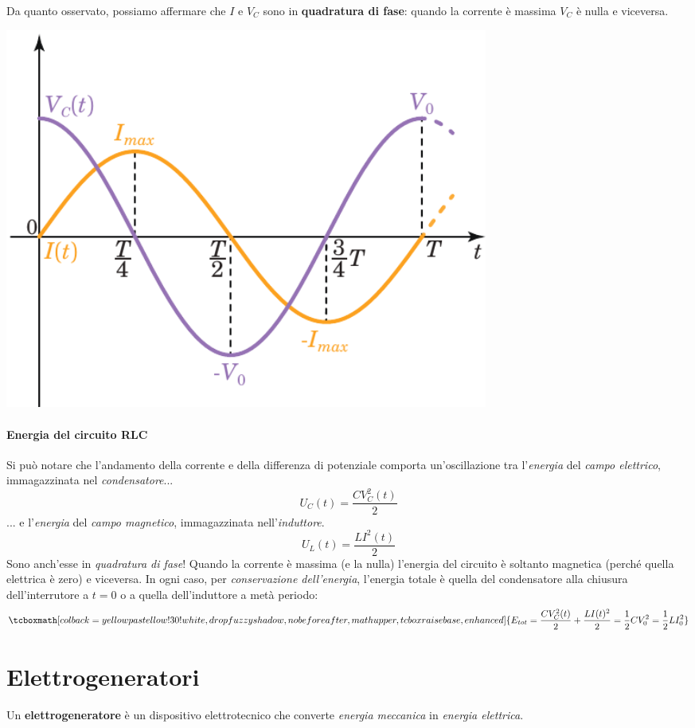Da quanto osservato, possiamo affermare che $I$ e $V_C$ sono in \textbf{quadratura di fase}: quando la corrente è massima $V_C$ è nulla e viceversa.
\begin{center}
	\includegraphics[width=0.7\textwidth]{images/chp11/chp11LCgraf.pdf}
\end{center}
\paragraph{Energia del circuito RLC}
Si può notare che l'andamento della corrente e della differenza di potenziale comporta un'oscillazione tra l'\textit{energia} del \textit{campo elettrico}, immagazzinata nel \textit{condensatore}...
\begin{equation*}
	U_C(t)=\frac{CV^2_C(t)}{2}
\end{equation*}
... e l'\textit{energia} del \textit{campo magnetico}, immagazzinata nell'\textit{induttore}.
\begin{equation*}
	U_L(t)=\frac{LI^2(t)}{2}
\end{equation*}
Sono anch'esse in \textit{quadratura di fase}! Quando la corrente è massima (e la \ddp nulla) l'energia del circuito è soltanto magnetica (perché quella elettrica è zero) e viceversa. In ogni caso, per \textit{conservazione dell'energia}, l'energia totale è quella del condensatore alla chiusura dell'interrutore a $t=0$ o a quella dell'induttore a metà periodo:
\begin{equation}
	\tcboxmath[colback=yellowpastellow!30!white,drop fuzzy shadow, nobeforeafter, math upper, tcbox raise base, enhanced]{E_{tot}=\frac{CV^2_C(t)}{2}+\frac{LI(t)^2}{2}=\frac{1}{2}CV_0^2=\frac{1}{2}LI_0^2}
\end{equation}
\section{Elettrogeneratori}
\begin{define}[Elettrogeneratore]
	Un \textbf{elettrogeneratore} è un dispositivo elettrotecnico che converte \textit{energia meccanica} in \textit{energia elettrica}.
\end{define}
